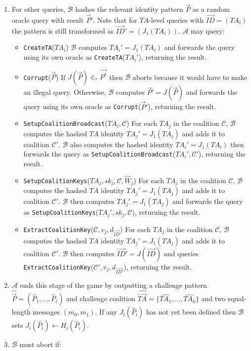 \documentclass[10pt]{llncs}
\newcommand{\A}{\mathcal{A}}
\newcommand{\B}{\mathcal{B}}
\newcommand{\C}{\mathcal{C}}
\newcommand{\ID}{\mathit{ID}}
\newcommand{\TA}{\mathit{TA}}
\newcommand{\sk}{\mathit{sk}}
\begin{document}
\begin{enumerate}
	\item For other queries, $\B$ hashes the relevant identity pattern $\vec{P}$ as a random oracle query with result $\vec{P}'$. Note that for $\TA$-level queries with $\vec{\ID} = (\TA_i)$ the pattern is still transformed as $\vec{\ID}' = (J_1 (\TA_i))$. $\A$ may query:
	\begin{itemize}
		\item \texttt{CreateTA}($\TA_i$) $\B$ computes $\TA_i' = J_1(\TA_i)$ and forwards the query using its own oracle as \texttt{CreateTA}($\TA_i'$), returning the result.
		\item \texttt{Corrupt}($\vec{P}$) If $J(\vec{P}) \in_* \vec{P^*}$ then $\B$ aborts because it would have to make an illegal query. Otherwise, $\B$ computes $\vec{P}' = J(\vec{P})$ and forwards the query using its own oracle as \texttt{Corrupt}($\vec{P}'$), returning the result.
		\item \texttt{SetupCoalitionBroadcast}($\TA_i, \C$) For each $\TA_j$ in the coalition $\C$, $\B$ computes the hashed $\TA$ identity $\TA_j' = J_1(\TA_j)$ and adds it to coalition $\C'$. $\B$ also computes the hashed identity $\TA_i' = J_1(\TA_i)$ then forwards the query as \texttt{SetupCoalitionBroadcast}($\TA_i', \C'$), returning the result.
		\item \texttt{SetupCoalitionKeys}($\TA_j, \sk_j, \C, \hat{W}_j$) For each $\TA_j$ in the coalition $\C$, $\B$ computes the hashed $\TA$ identity $\TA_j' = J_1(\TA_j)$ and adds it to coalition $\C'$. $\B$ then computes $\TA_j' = J_1(\TA_j)$ and forwards the query as \texttt{SetupCoalitionKeys}($\TA_j', \sk_j, \C$), returning the result.
		\item \texttt{ExtractCoalitionKey}($\C, v_j, d_{\vec{\ID}}$) For each $\TA_j$ in the coalition $\C$, $\B$ computes the hashed $\TA$ identity $\TA_j' = J_1(\TA_j)$ and adds it to coalition $\C'$. $\B$ then computes $\vec{\ID}' = J(\vec{\ID})$ and queries \texttt{ExtractCoalitionKey}($\C', v_j, d_{\vec{\ID'}}$), returning the result.
	\end{itemize}
	\item $\A$ ends this stage of the game by outputting a challenge pattern $\widehat{\vec{P}} = (\widehat{P}_1, ..., \widehat{P}_{\ell})$ and challenge coalition $\widehat{\vec{\TA}} = \{\widehat{\TA_1}, ..., \widehat{\TA_k}\}$ and two equal-length messages $(m_0, m_1)$. If any $J_i(\widehat{P}_i)$ has not yet been defined then $\B$ sets $J_i(\widehat{P}_i) \gets H_i(\widehat{P}_i)$.
	\item $\B$ must abort if:
		\begin{itemize}

\end{itemize}
\end{enumerate}
\end{document}
